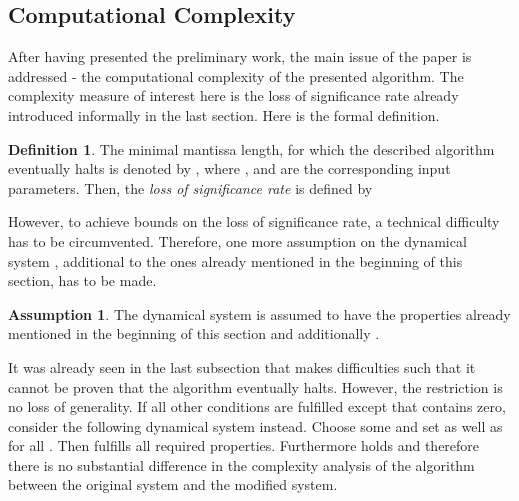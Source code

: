 \documentclass[copyright,creativecommons]{eptcs}
\theoremstyle{definition}
\newtheorem{definition}{Definition}[section]
\newtheorem{assumption}{Assumption}[section]
\begin{document}
\subsection{Computational Complexity}
After having presented the preliminary work, the main issue of the
paper is addressed - the computational complexity of the presented
algorithm. The complexity measure of interest here is the loss of
significance rate already introduced informally in the last section.
Here is the formal definition.
\begin{definition}
\label{def:losr}
The minimal mantissa length, for which the described algorithm
eventually halts is denoted by , where , 
and  are the corresponding input parameters. Then, the
{\em loss of significance rate}
 is defined by

\end{definition}
However, to achieve bounds on the loss of significance rate,
a technical difficulty has to be
circumvented. Therefore, one more assumption on the dynamical system
, additional to the ones already mentioned in the beginning
of this section, has to be made.
\begin{assumption}
\label{ass:main}
The dynamical system  is assumed to have the properties
already mentioned in the beginning of this section and
additionally .
\end{assumption}
It was already seen in the last subsection that 
makes difficulties such that it cannot be proven that
the algorithm eventually halts. However,
the restriction  is no loss of generality. If all
other conditions are fulfilled except that 
contains zero, consider the following dynamical system
 instead. Choose some  and
set  as well as
 for all . Then
 fulfills all required properties.
Furthermore  holds and therefore there
is no substantial difference in the complexity analysis of the
algorithm between the original system and the modified system.
\end{document}
